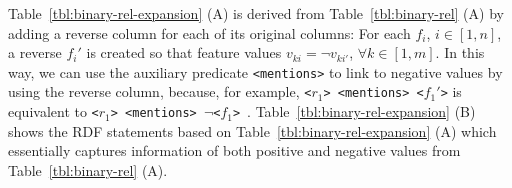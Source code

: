 \begin{myexp}
\label{binary-reverse}
Table~\ref{tbl:binary-rel-expansion} (A) is derived from Table~\ref{tbl:binary-rel} (A) by adding a reverse column for each of its original columns: For each $f_i$, $i \in [1, n]$, a reverse $f_i'$ is created so that feature values $v_{ki} = \neg v_{ki'}$,  $\forall{k\in[1,m]}$. In this way, we can use the auxiliary predicate \texttt{<mentions>} to link to negative values by using the reverse column, because, for example, \texttt{<$r_1$> <mentions> <$f_1'$>} is equivalent to \texttt{<$r_1$> <mentions> $\neg$<$f_1$>}~. Table~\ref{tbl:binary-rel-expansion} (B) shows the RDF statements based on Table~\ref{tbl:binary-rel-expansion} (A) which essentially captures information of both positive and negative values from Table~\ref{tbl:binary-rel} (A).
\end{myexp}

